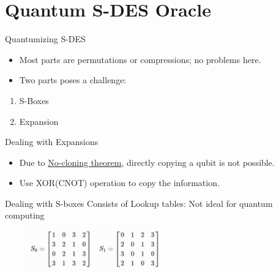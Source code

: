 \documentclass{beamer}
\begin{document}
    \section{Quantum S-DES Oracle}

    \begin{frame}{Quantumizing S-DES}
        \begin{itemize}
            \item Most parts are permutations or compressions; no problems here.
            \item Two parts poses a challenge:
        \end{itemize}
        \begin{enumerate}
            \item S-Boxes
            \item Expansion
        \end{enumerate}
    \end{frame}

    \begin{frame}{Dealing with Expansions}
        \begin{itemize}
            \item Due to \href{https://en.wikipedia.org/wiki/No-cloning_theorem}{No-cloning theorem}, directly copying a qubit is not possible.
            \item Use XOR(CNOT) operation to copy the information.
        \end{itemize}
    \end{frame}

    \begin{frame}{Dealing with S-boxes}
        Consists of Lookup tables: Not ideal for quantum computing
        \begin{figure}[h]
            \centering
            \includegraphics[width=0.5\textwidth]{./Images/sbox.png}
        \end{figure}
    \end{frame}
\end{document}
